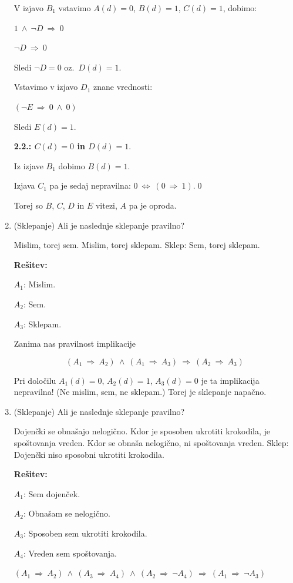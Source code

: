 \documentclass[11pt,paper=b5,footinclude,headinclude]{scrbook} %
\def\inn {{~\wedge~}}
\def\sledi {{~\Rightarrow~}}
\def\cee {{~\Leftrightarrow~}}
\begin{document}
\begin{enumerate}
V izjavo $B_1$ vstavimo $A(d) = 0$, $B(d) = 1$, $C(d) = 1$, dobimo:

$1 \inn \neg D\sledi 0$

$\neg D\sledi 0$

Sledi $\neg D = 0$ oz.~$D(d) = 1$.

Vstavimo v izjavo $D_1$ znane vrednosti:

$(\neg E \sledi 0 \inn 0)$

Sledi $E(d) = 1$.

\bigskip

\textbf{2.2.: $C(d) = 0$ in $D(d) = 1$}.

Iz izjave $B_1$ dobimo $B(d) = 1$.

Izjava $C_1$ pa je sedaj nepravilna:
$0 \cee (0\sledi 1)$.\qed

Torej so $B$, $C$, $D$ in $E$ vitezi, $A$ pa je oproda.


\bigskip
\item (Sklepanje)
Ali je naslednje sklepanje pravilno?

Mislim, torej sem. Mislim, torej sklepam. Sklep: Sem, torej sklepam.


\textbf{Rešitev:}

$A_1$: Mislim.

$A_2$: Sem.

$A_3$: Sklepam.

Zanima nas pravilnost implikacije

$$(A_1\sledi A_2)\inn(A_1\sledi A_3)\sledi(A_2\sledi A_3)$$

Pri določilu $A_1(d) = 0$, $A_2(d) = 1$, $A_3(d) = 0$ je ta implikacija nepravilna!
(Ne mislim, sem, ne sklepam.)
Torej je sklepanje napačno.

\bigskip

\item (Sklepanje)
Ali je naslednje sklepanje pravilno?

Dojenčki se obnašajo nelogično. Kdor je sposoben ukrotiti krokodila, je spoštovanja vreden.
Kdor se obnaša nelogično, ni spoštovanja vreden. Sklep: Dojenčki niso sposobni ukrotiti krokodila.


\textbf{Rešitev:}

$A_1$: Sem dojenček.

$A_2$: Obnašam se nelogično.

$A_3$: Sposoben sem ukrotiti krokodila.

$A_4$: Vreden sem spoštovanja.

$(A_1\sledi A_2)\inn (A_3\sledi A_4) \inn (A_2\sledi \neg A_4)\sledi (A_1\sledi \neg A_3)$


\end{enumerate}
\end{document}
